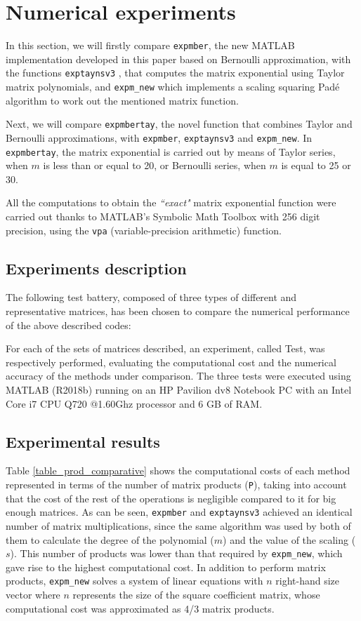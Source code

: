\section{Numerical experiments}
In this section, we will firstly compare \texttt{expmber}, the new MATLAB implementation developed in this paper based on Bernoulli approximation, with the functions \texttt{exptaynsv3} \cite{RSID16}, that computes the matrix exponential using Taylor matrix polynomials, and \texttt{expm\_new} \cite{AlHi09} which implements a scaling squaring Pad\'e algorithm to work out the mentioned matrix function. 

Next, we will compare  \texttt{expmbertay}, the novel function that combines Taylor and Bernoulli approximations, with \texttt{expmber}, \texttt{exptaynsv3} and \texttt{expm\_new}. In \texttt{expmbertay}, the matrix exponential is carried out by means of Taylor series, when $m$ is less than or equal to 20, or Bernoulli series, when $m$ is equal to 25 or 30.

All the computations to obtain the {\it``exact"} matrix exponential function were carried out thanks to MATLAB's Symbolic Math Toolbox with 256 digit precision, using the \texttt{vpa} (variable-precision arithmetic) function.

\subsection{Experiments description}
The following test battery, composed of three types of different and representative matrices, has been chosen to compare the numerical performance of the above described codes:

For each of the sets of matrices described, an experiment, called Test, was respectively performed, evaluating the computational cost and the numerical accuracy of the methods under comparison. The three tests were executed using MATLAB (R2018b) running on an HP Pavilion dv8 Notebook PC with an Intel Core i7 CPU Q720 @1.60Ghz processor and 6 GB of RAM. 

\subsection{Experimental results}

Table \ref{table_prod_comparative} shows the computational costs of each method represented in terms of the number of matrix products (\texttt{P}), taking into account that the cost of the rest of the operations is negligible compared to it for big enough matrices. As can be seen, \texttt{expmber} and \texttt{exptaynsv3} achieved an identical number of matrix multiplications, since the same algorithm was used by both of them to calculate the degree of the polynomial ($m$) and the value of the scaling ($s$). This number of products was lower than that required by \texttt{expm\_new}, which gave rise to the highest computational cost. In addition to perform matrix products, \texttt{expm\_new} solves a system of linear equations with $n$ right-hand size vector where $n$ represents the size of the square coefficient matrix, whose computational cost was approximated as 4/3 matrix products.

